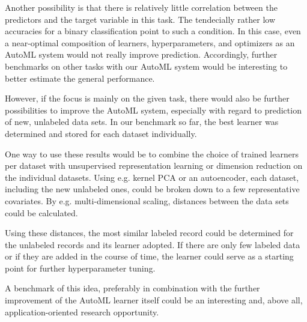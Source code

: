 \documentclass{article}
\begin{document}
Another possibility is that there is relatively little correlation between the predictors and the target variable in this task. The tendecially rather low accuracies for a binary classification point to such a condition. In this case, even a near-optimal composition of learners, hyperparameters, and optimizers as an AutoML system would not really improve prediction. Accordingly, further benchmarks on other tasks with our AutoML system would be interesting to better estimate the general performance.

However, if the focus is mainly on the given task, there would also be further possibilities to improve the AutoML system, especially with regard to prediction of new, unlabeled data sets. In our benchmark so far, the best learner was determined and stored for each dataset individually. 

One way to use these results would be to combine the choice of trained learners per dataset with unsupervised representation learning or dimension reduction on the individual datasets. Using e.g. kernel PCA or an autoencoder, each dataset, including the new unlabeled ones, could be broken down to a few representative covariates. By e.g. multi-dimensional scaling, distances between the data sets could be calculated.

Using these distances, the most similar labeled record could be determined for the unlabeled records and its learner adopted. If there are only few labeled data or if they are added in the course of time, the learner could serve as a starting point for further hyperparameter tuning.

A benchmark of this idea, preferably in combination with the further improvement of the AutoML learner itself could be an interesting and, above all, application-oriented research opportunity.

\nocite{*}

\end{document}

